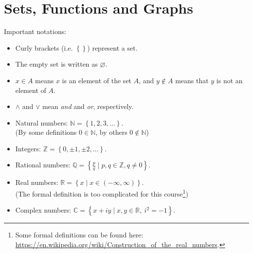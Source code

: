 \section{Sets, Functions and Graphs}

\begin{answer}
  Important notations:
  \begin{itemize}
    \item Curly brackets (i.e. $\left\{  \right\}$) represent a set.
    \item The empty set is written as $\varnothing$.
    \item $x\in A$ means $x$ is an element of the set $A$, and $y\notin A$ means that $y$ is not an element of $A$.
    \item $\wedge$ and $\vee$ mean \textit{and} and \textit{or}, respectively. 
    \item Natural numbers: $\mathbb{N}=\left\{ 1,2,3,\dots \right\}$.\\(By some definitions $0\in\mathbb{N}$, by others $0\notin\mathbb{N}$)
    \item Integers: $\mathbb{Z}=\left\{ 0,\pm 1,\pm 2,\dots \right\}$.
    \item Rational numbers: $\mathbb{Q}=\left\{ \frac{p}{q} \mid p,q\in\mathbb{Z}, q\neq0\right\}$.
    \item Real numbers: $\mathbb{R}=\left\{ x \mid x\in\left( -\infty,\infty \right) \right\}$.\\(The formal definition is too complicated for this course\footnote{Some formal definitions can be found here: \url{https://en.wikipedia.org/wiki/Construction_of_the_real_numbers}.})
    \item Complex numbers: $\mathbb{C}=\left\{ x+iy \mid x,y\in\mathbb{R},\ i^{2}=-1 \right\}$.
  \end{itemize}
\end{answer}

